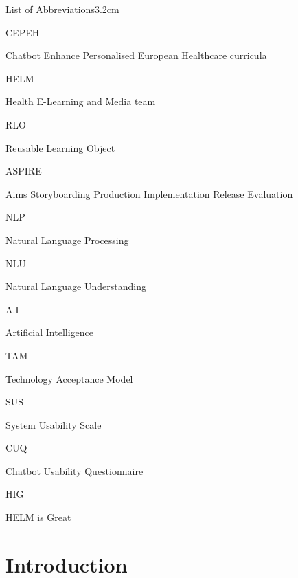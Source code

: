 \documentclass[a4paper, nobind]{templates/ociamthesis}
\begin{document}
\begin{romanpages}
\begin{mclistof}{List of Abbreviations}{3.2cm}
\item[CEPEH]

Chatbot Enhance Personalised European Healthcare curricula

\item[HELM]

Health E-Learning and Media team

\item[RLO]

Reusable Learning Object

\item[ASPIRE]

Aims Storyboarding Production Implementation Release Evaluation

\item[NLP]

Natural Language Processing

\item[NLU]

Natural Language Understanding

\item[A.I]

Artificial Intelligence

\item[TAM]

Technology Acceptance Model

\item[SUS]

System Usability Scale

\item[CUQ]

Chatbot Usability Questionnaire

\item[HIG]

HELM is Great

\end{mclistof} 


\end{romanpages}

\flushbottom

\hypertarget{introduction}{%
\chapter*{Introduction}\label{introduction}}
\end{document}
